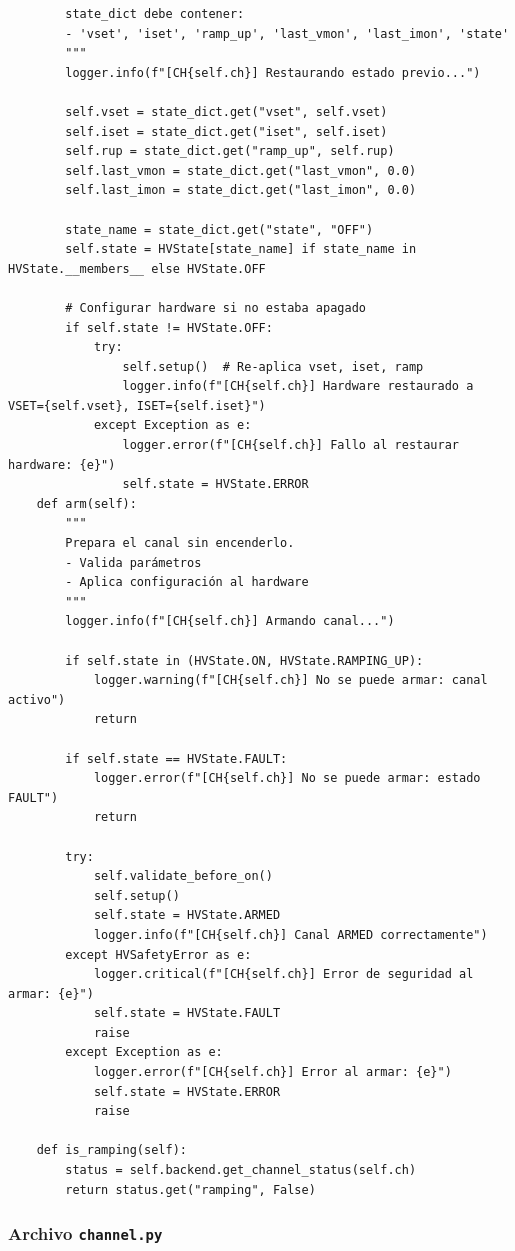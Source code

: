 \documentclass{article}
\begin{document}
\begin{lstlisting}
        state_dict debe contener:
        - 'vset', 'iset', 'ramp_up', 'last_vmon', 'last_imon', 'state'
        """
        logger.info(f"[CH{self.ch}] Restaurando estado previo...")

        self.vset = state_dict.get("vset", self.vset)
        self.iset = state_dict.get("iset", self.iset)
        self.rup = state_dict.get("ramp_up", self.rup)
        self.last_vmon = state_dict.get("last_vmon", 0.0)
        self.last_imon = state_dict.get("last_imon", 0.0)

        state_name = state_dict.get("state", "OFF")
        self.state = HVState[state_name] if state_name in HVState.__members__ else HVState.OFF

        # Configurar hardware si no estaba apagado
        if self.state != HVState.OFF:
            try:
                self.setup()  # Re-aplica vset, iset, ramp
                logger.info(f"[CH{self.ch}] Hardware restaurado a VSET={self.vset}, ISET={self.iset}")
            except Exception as e:
                logger.error(f"[CH{self.ch}] Fallo al restaurar hardware: {e}")
                self.state = HVState.ERROR
    def arm(self):
        """
        Prepara el canal sin encenderlo.
        - Valida parámetros
        - Aplica configuración al hardware
        """
        logger.info(f"[CH{self.ch}] Armando canal...")

        if self.state in (HVState.ON, HVState.RAMPING_UP):
            logger.warning(f"[CH{self.ch}] No se puede armar: canal activo")
            return

        if self.state == HVState.FAULT:
            logger.error(f"[CH{self.ch}] No se puede armar: estado FAULT")
            return

        try:
            self.validate_before_on()
            self.setup()
            self.state = HVState.ARMED
            logger.info(f"[CH{self.ch}] Canal ARMED correctamente")
        except HVSafetyError as e:
            logger.critical(f"[CH{self.ch}] Error de seguridad al armar: {e}")
            self.state = HVState.FAULT
            raise
        except Exception as e:
            logger.error(f"[CH{self.ch}] Error al armar: {e}")
            self.state = HVState.ERROR
            raise
    
    def is_ramping(self):
        status = self.backend.get_channel_status(self.ch)
        return status.get("ramping", False)

\end{lstlisting}

\subsubsection{Archivo \texttt{channel.py}}
\end{document}
